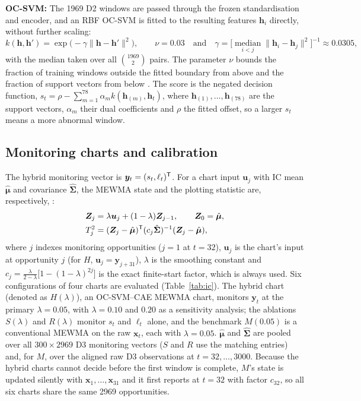 \textbf{OC-SVM:} The 1969 D2 windows are passed through the frozen standardisation and encoder, and
an RBF OC-SVM is fitted to the resulting features $\bm{h}_i$ directly, without further scaling:
\begin{equation}
k(\bm{h},\bm{h}')=\exp\!\big(-\gamma\lVert\bm{h}-\bm{h}'\rVert^2\big),\qquad \nu=0.03\quad\text{and}\quad \gamma=\Big[\operatorname*{median}_{i<j}\lVert\bm{h}_i-\bm{h}_j\rVert^2\Big]^{-1}\approx0.0305,
\label{eq:ocsvm}
\end{equation}
with the median taken over all $\binom{1969}{2}$ pairs. The parameter $\nu$ bounds the fraction of
training windows outside the fitted boundary from above and the fraction of support vectors from
below \citep{scholkopf_estimating_2001}. The score is the negated decision function, $s_t=\rho-\sum_{m=1}^{78}\alpha_m k(\bm{h}_{(m)},\bm{h}_t)$, where $\bm{h}_{(1)},\dots,\bm{h}_{(78)}$ are the support vectors, $\alpha_m$ their dual coefficients and $\rho$ the fitted offset, so a larger $s_t$ means a
more abnormal window.

\subsection{Monitoring charts and calibration}

The hybrid monitoring vector is $\bm{y}_t=(s_t,\ell_t)^{\mathsf T}$. For a chart input $\bm{u}_j$ with IC mean $\hat{\bm{\mu}}$ and covariance $\hat{\bm{\Sigma}}$, the MEWMA state
and the plotting statistic are, respectively, \citep{lowry_multivariate_1992}:
\begin{align}
\bm{Z}_j&=\lambda\bm{u}_j+(1-\lambda)\bm{Z}_{j-1},\qquad \bm{Z}_0=\hat{\bm{\mu}},\label{eq:mewma}\\
T_j^2&=(\bm{Z}_j-\hat{\bm{\mu}})^{\mathsf T}(c_j\hat{\bm{\Sigma}})^{-1}(\bm{Z}_j-\hat{\bm{\mu}}),\label{eq:t2}
\end{align}
where $j$ indexes monitoring opportunities ($j=1$ at $t=32$), $\bm{u}_j$ is the chart's input at opportunity $j$ (for $H$, $\bm{u}_j=\bm{y}_{j+31}$), $\lambda$ is the smoothing constant and $c_j=\tfrac{\lambda}{2-\lambda}\big[1-(1-\lambda)^{2j}\big]$ is the exact finite-start factor, which is always used. Six configurations of four charts are evaluated (Table~\ref{tab:ic}). The
hybrid chart (denoted as $H(\lambda)$), an OC-SVM--CAE MEWMA chart, monitors $\bm{y}_t$ at the primary $\lambda=0.05$, with $\lambda=0.10$ and $0.20$ as a
sensitivity analysis; the ablations $S(\lambda)$ and $R(\lambda)$ monitor $s_t$ and $\ell_t$ alone, and the benchmark
$M(0.05)$ is a conventional MEWMA on the raw $\bm{x}_t$, each with $\lambda=0.05$. $\hat{\bm{\mu}}$ and $\hat{\bm{\Sigma}}$ are pooled over all $300\times2969$ D3 monitoring vectors ($S$ and $R$ use the matching
entries) and, for $M$, over the aligned raw D3 observations at $t=32,\dots,3000$. Because the hybrid
charts cannot decide before the first window is complete, $M$'s state is updated silently with $\bm{x}_1,\dots,\bm{x}_{31}$ and it first reports at $t=32$ with factor $c_{32}$, so all six charts share the
same 2969 opportunities.

